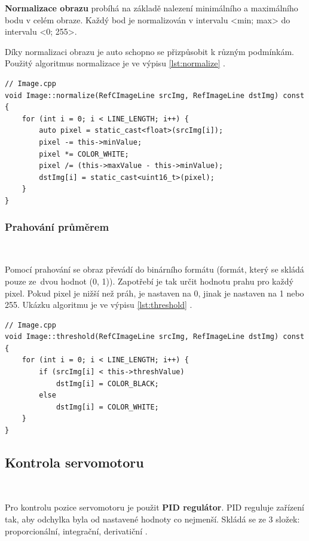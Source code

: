 \textbf{Normalizace obrazu} probíhá na základě nalezení minimálního a maximálního
bodu v celém obraze. Každý bod je normalizován v intervalu <min; max> do intervalu
<0; 255>.

Díky normalizaci obrazu je auto schopno se přizpůsobit k různým  podmínkám. Použitý
algoritmus normalizace je ve výpisu \ref{lst:normalize} \cite{robot}.
\begin{lstlisting}[caption = Normalizace obrazu, label = lst:normalize]
// Image.cpp
void Image::normalize(RefCImageLine srcImg, RefImageLine dstImg) const {
    for (int i = 0; i < LINE_LENGTH; i++) {
        auto pixel = static_cast<float>(srcImg[i]);
        pixel -= this->minValue;
        pixel *= COLOR_WHITE;
        pixel /= (this->maxValue - this->minValue);
        dstImg[i] = static_cast<uint16_t>(pixel);
    }
}
\end{lstlisting}

\subsubsection*{Prahování průměrem}\

Pomocí prahování se obraz převádí do binárního formátu (formát, který se skládá
pouze ze~dvou hodnot (0, 1)). Zapotřebí je tak určit hodnotu prahu pro každý pixel.
Pokud pixel je nižší než práh, je nastaven na 0, jinak je nastaven na 1 nebo 255.
Ukázku algoritmu je ve výpisu \ref{lst:threshold} \cite{robot}.
\begin{lstlisting}[caption = Prahování průměrem, label = lst:threshold]
// Image.cpp
void Image::threshold(RefCImageLine srcImg, RefImageLine dstImg) const {
    for (int i = 0; i < LINE_LENGTH; i++) {
        if (srcImg[i] < this->threshValue)
            dstImg[i] = COLOR_BLACK;
        else
            dstImg[i] = COLOR_WHITE;
    }
}
\end{lstlisting}

\subsection{Kontrola servomotoru}\

Pro kontrolu pozice servomotoru je použit \textbf{PID regulátor}. PID reguluje
zařízení tak, aby odchylka byla od nastavené hodnoty co nejmenší. Skládá se ze 3
složek: proporcionální, integrační, derivatiční \cite{PID}.

